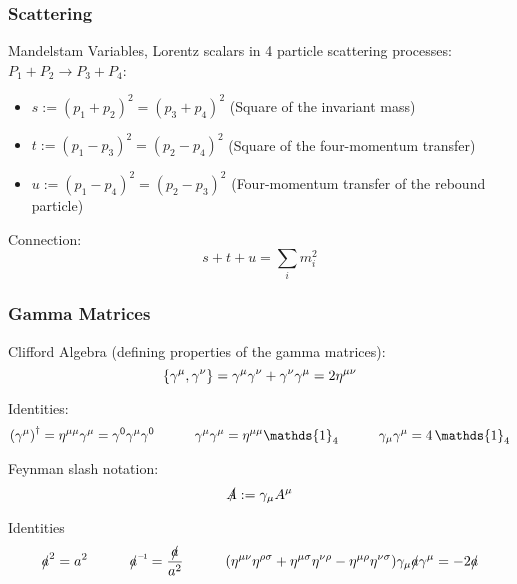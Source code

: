 		\subsubsection{Scattering}
			\noindent
			Mandelstam Variables, \ie Lorentz scalars in 4 particle scattering processes: $P_1 + P_2 \to P_3 + P_4$:
			\begin{itemize}\itemsep -0pt
				\item $s:=(p_1+p_2)^2=(p_3+p_4)^2$ \hfill{(Square of the invariant mass)}
				\item $t:=(p_1-p_3)^2=(p_2-p_4)^2$ \hfill{(Square of the four-momentum transfer)}
				\item $u:=(p_1-p_4)^2=(p_2-p_3)^2$ \hfill{(Four-momentum transfer of the rebound particle)}
			\end{itemize}

			\noindent
			Connection:
			\begin{equation}
				s+t+u = \sum_i m_i^2
			\end{equation}

		\subsubsection{Gamma Matrices}
			\noindent
			Clifford Algebra (defining properties of the gamma matrices):
			\begin{equation}
				\acomm{\gamma^\mu}{\gamma^\nu} = \gamma^\mu \gamma^\nu + \gamma^\nu \gamma^\mu = 2 \eta^{\mu\nu}
			\end{equation}

			\noindent
			Identities:
			\begin{equation}
				\qty(\gamma^\mu)^\dagger = \eta^{\mu\mu} \gamma^\mu = \gamma^0 \gamma^\mu \gamma^0
				\hsp \gamma^\mu \gamma^\mu = \eta^{\mu\mu} \mathds{1}_4
				\hsp \gamma_\mu \gamma^\mu = 4 \,\mathds{1}_4
			\end{equation}

			\noindent
			Feynman slash notation:
			\begin{equation}
				\slashed{A} := \gamma_\mu A^\mu
			\end{equation}

			\noindent
			Identities
			\begin{equation}
				\slashed{a}^2 = a^2
				\hsp \inv{\slashed{a}} = \frac{\slashed{a}}{a^2}
				\hsp \qty(\eta^{\mu\nu}\eta^{\rho\sigma} + \eta^{\mu\sigma}\eta^{\nu\rho} - \eta^{\mu\rho}\eta^{\nu\sigma})
				\gamma_\mu \slashed{a} \gamma^\mu = -2 \slashed{a}
			\end{equation}

